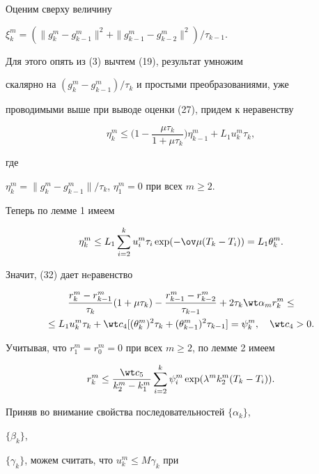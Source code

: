Оценим сверху величину


$\xi_k^m=(\|g_k^m-g_{k-1}^m\|^2+\|g_{k-1}^m-g_{k-2}^m\|^2)/\tau_{k-1}$.


Для этого опять из (3) вычтем (19), результат умножим


скалярно на $(g_k^m-g_{k-1}^m)/\tau_k$ и простыми преобразованиями, уже


проводимыми выше при выводе оценки (27), придем к неравенству


$$


\eta_k^m\leq \bigg(1-\frac{\mu \tau_k}{1+\mu \tau_k} \bigg)\eta_{k-1}^m


+L_1u_k^m\tau_k,


$$


где


$\eta_k^m=\|g_k^m-g_{k-1}^m\|/\tau_k$, $\eta_1^m=0$ при всех $m\geq 2$.


Теперь по лемме 1 имеем


$$


\eta_k^m\leq L_1\sum_{i=2}^ku_i^m\tau_i\exp(-\ov \mu (T_k-T_i))=L_1


\theta_k^m.


$$


Значит, (32) дает нeравенство


\begin{multline*}


\frac{r_k^m -r_{k-1}^m}{\tau_k}(1+\mu \tau_k)-


\frac{r_{k-1}^m -r_{k-2}^m}{\tau_{k-1}}+2\tau_k\wt \alpha_mr_k^m \leq \\


\le L_1u^m_k\tau_k+\wt c_4[(\theta_k^m)^2\tau_k+


(\theta_{k-1}^m)^2\tau_{k-1}]=\psi_k^m,\quad \wt c_4 >0.


\end{multline*}


Учитывая, что $r_1^m=r_0^m=0$ при всех $m\geq 2$, по лемме 2 имеем


\begin{equation}\label {33}


r_k^m \leq \frac{\wt c_5}{k_2^m-k_1^m}


\sum_{i=2}^k\psi_i^m\exp(\lambda^mk_2^m(T_k-T_i)).


\end{equation}


Приняв во внимание свойства последовательностей $\{\alpha_k\}$,


$\{\beta_k\}$,


$\{\gamma_k\}$, можем считать, что $u_k^m \leq M\gamma_k$ при


